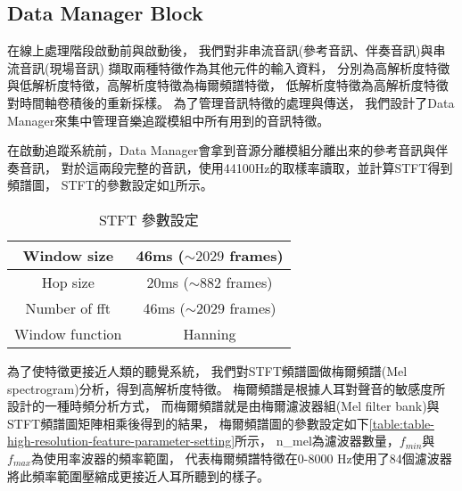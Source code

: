 \documentclass[class=NCU_thesis, crop=false]{standalone}
\begin{document}


\subsection{Data Manager Block} \label{ch3-subst-data-manager}
在線上處理階段啟動前與啟動後，
我們對非串流音訊(參考音訊、伴奏音訊)與串流音訊(現場音訊)
擷取兩種特徵作為其他元件的輸入資料，
分別為高解析度特徵與低解析度特徵，高解析度特徵為梅爾頻譜特徵，
低解析度特徵為高解析度特徵對時間軸卷積後的重新採樣。
為了管理音訊特徵的處理與傳送，
我們設計了Data Manager來集中管理音樂追蹤模組中所有用到的音訊特徵。

在啟動追蹤系統前，Data Manager會拿到音源分離模組分離出來的參考音訊與伴奏音訊，
對於這兩段完整的音訊，使用44100Hz的取樣率讀取，並計算STFT得到頻譜圖，
STFT的參數設定如\cref{table:table-stft-parameter-setting}所示。

\begin{table}[h]
    \centering
    \caption{STFT 參數設定}
    \label{table:table-stft-parameter-setting}
    \begin{tabular}{|c|c|}
        \hline
        \multicolumn{1}{|c|}{Window size} & \multicolumn{1}{|c|}{46ms ($\sim 2029$ frames)}\\
        \hline
        Hop size & 20ms ($\sim 882$ frames)\\
        \hline
        Number of fft & 46ms ($\sim 2029$ frames)\\
        \hline
        Window function & Hanning \\
        \hline
    \end{tabular}
\end{table}

為了使特徵更接近人類的聽覺系統，
我們對STFT頻譜圖做梅爾頻譜(Mel spectrogram)分析，得到高解析度特徵。
梅爾頻譜是根據人耳對聲音的敏感度所設計的一種時頻分析方式，
而梅爾頻譜就是由梅爾濾波器組(Mel filter bank)與STFT頻譜圖矩陣相乘後得到的結果，
梅爾頻譜圖的參數設定如下\cref{table:table-high-resolution-feature-parameter-setting}所示，
n\_mel為濾波器數量，$f_{min}$與$f_{max}$為使用率波器的頻率範圍，
代表梅爾頻譜特徵在0-8000 Hz使用了84個濾波器將此頻率範圍壓縮成更接近人耳所聽到的樣子。
\end{document}

